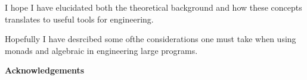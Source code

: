 \documentclass[a4paper,10pt]{article}
\theoremstyle{definition}
\begin{document}
I hope I have elucidated
both the theoretical background
and how these concepts translates to
useful tools for engineering.


Hopefully I have desrcibed some ofthe considerations
one must take when using
monads and algebraic
in engineering large programs.


\textbf{Acknowledgements}

\pagebreak
\appendix



\pagebreak


\end{document}
